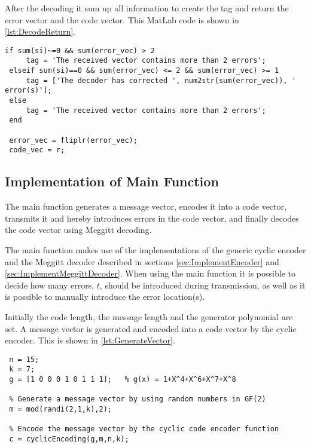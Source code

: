 \documentclass[Main]{subfiles}
\begin{document}
After the decoding it sum up all information to create the tag and return the error vector and the code vector.
This MatLab code is shown in \codeTitle \ref{lst:DecodeReturn}.

\begin{lstlisting}[caption=Meggitt decode return, style=Code-Matlab, label=lst:DecodeReturn]
 if sum(si)~=0 && sum(error_vec) > 2
     tag = 'The received vector contains more than 2 errors';
 elseif sum(si)==0 && sum(error_vec) <= 2 && sum(error_vec) >= 1
     tag = ['The decoder has corrected ', num2str(sum(error_vec)), ' error(s)'];
 else
     tag = 'The received vector contains more than 2 errors';
 end
 
 error_vec = fliplr(error_vec);
 code_vec = r;
\end{lstlisting}








\subsection{Implementation of Main Function}
The main function generates a message vector, encodes it into a code vector, transmits it and hereby introduces errors in the code vector, and finally decodes the code vector using Meggitt decoding.

The main function makes use of the implementations of the generic cyclic encoder and the Meggitt decoder described in sections \ref{sec:ImplementEncoder} and \ref{sec:ImplementMeggittDecoder}. 
When using the main function it is possible to decide how many errors, $t$, should be introduced during transmission, as well as it is possible to manually introduce the error location(s).

Initially the code length, the message length and the generator polynomial are set. A message vector is generated and encoded into a code vector by the cyclic encoder. This is shown in \codeTitle \ref{lst:GenerateVector}. 

\begin{lstlisting}[caption=Generating and Encoding a Vector, style=Code-Matlab, label=lst:GenerateVector]
 % Set the code length, message length and the generator polynomial
 n = 15;
 k = 7;
 g = [1 0 0 0 1 0 1 1 1];   % g(x) = 1+X^4+X^6+X^7+X^8

 % Generate a message vector by using random numbers in GF(2)
 m = mod(randi(2,1,k),2);

 % Encode the message vector by the cyclic code encoder function
 c = cyclicEncoding(g,m,n,k);
\end{lstlisting}
\end{document}
